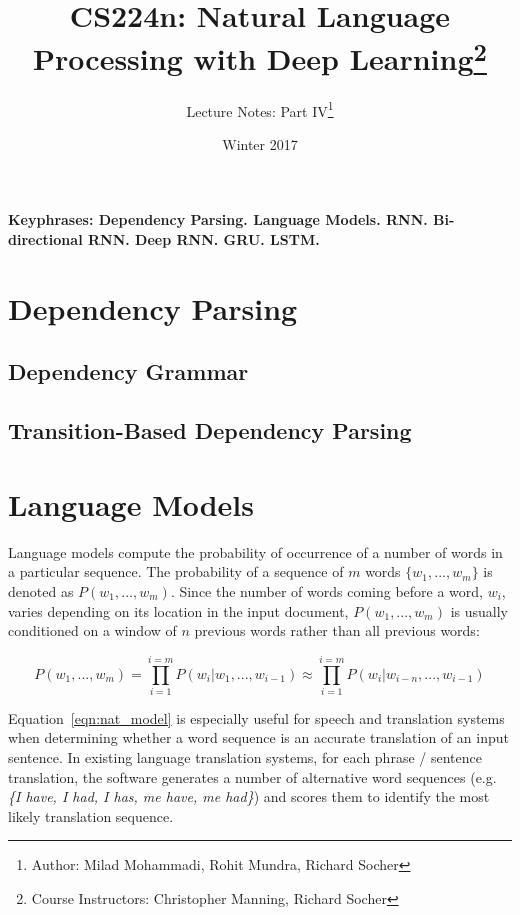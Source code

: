 \documentclass{tufte-handout}
\title{CS224n: Natural Language Processing with Deep Learning\thanks{Course Instructors: Christopher Manning, Richard Socher}}
\author[Milad Mohammadi, Rohit Mundra, Richard Socher]{Lecture Notes: Part IV\thanks{Author: Milad Mohammadi, Rohit Mundra, Richard Socher}}
\date{Winter 2017} %
\begin{document}
\maketitle%

\textbf{Keyphrases: Dependency Parsing. Language Models. RNN. Bi-directional RNN. Deep RNN. GRU. LSTM.}
\section{Dependency Parsing}
\subsection{Dependency Grammar}

\subsection{Transition-Based Dependency Parsing}

\section{Language Models}
Language models compute the probability of occurrence of a number of words in a particular sequence. The probability of a sequence of $m$ words $\{w_1, ..., w_m \}$ is denoted as $P(w_1,...,w_m)$. Since the number of words coming before a word, $w_i$, varies depending on its location in the input document, $P(w_1,...,w_m)$ is usually conditioned on a window of $n$ previous words rather than all previous words:

\begin{equation}
	P(w_1,...,w_m) = \prod_{i=1}^{i=m} P(w_{i} | w_1, ..., w_{i-1}) \approx \prod_{i=1}^{i=m} P(w_{i} | w_{i-n}, ..., w_{i-1})
	\label{eqn:nat_model}
\end{equation}

Equation~\ref{eqn:nat_model} is especially useful for speech and translation systems when determining whether a word sequence is an accurate translation of an input sentence. In existing language translation systems, for each phrase / sentence translation, the software generates a number of alternative word sequences (e.g. \textit{\{I have, I had, I has, me have, me had\}}) and scores them to identify the most likely translation sequence. 
\end{document}
